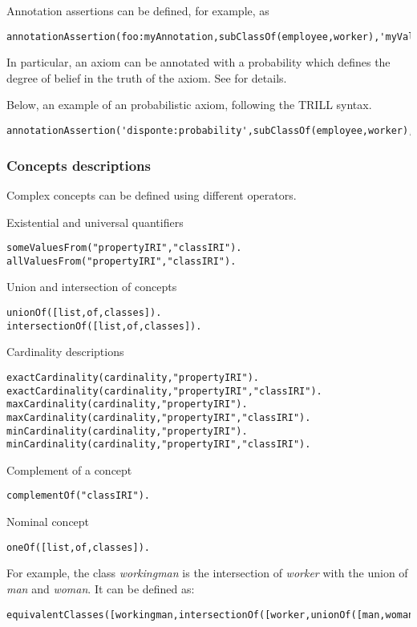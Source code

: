 Annotation assertions can be defined, for example, as
\begin{verbatim}
annotationAssertion(foo:myAnnotation,subClassOf(employee,worker),'myValue').
\end{verbatim}


In particular, an axiom can be annotated with a probability which defines the degree of belief in the truth of the axiom. See \cite{trillquale} for details.


Below, an example of an probabilistic axiom, following the TRILL syntax.
\begin{verbatim}
annotationAssertion('disponte:probability',subClassOf(employee,worker),literal('0.6')).
\end{verbatim}

\subsubsection{Concepts descriptions}
Complex concepts can be defined using different operators.

Existential and universal quantifiers
\begin{verbatim}
someValuesFrom("propertyIRI","classIRI").
allValuesFrom("propertyIRI","classIRI").
\end{verbatim}
Union and intersection of concepts
\begin{verbatim}
unionOf([list,of,classes]).
intersectionOf([list,of,classes]).
\end{verbatim}
Cardinality descriptions
\begin{verbatim}
exactCardinality(cardinality,"propertyIRI").
exactCardinality(cardinality,"propertyIRI","classIRI").
maxCardinality(cardinality,"propertyIRI").
maxCardinality(cardinality,"propertyIRI","classIRI").
minCardinality(cardinality,"propertyIRI").
minCardinality(cardinality,"propertyIRI","classIRI").
\end{verbatim}
Complement of a concept
\begin{verbatim}
complementOf("classIRI").
\end{verbatim}
Nominal concept
\begin{verbatim}
oneOf([list,of,classes]).
\end{verbatim}
For example, the class \textit{workingman} is the intersection of \textit{worker} with the union of \textit{man} and \textit{woman}. It can be defined as:
\begin{verbatim}
equivalentClasses([workingman,intersectionOf([worker,unionOf([man,woman])])]).
\end{verbatim}


